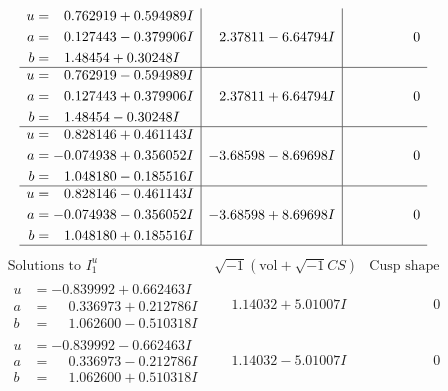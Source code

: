 \documentclass[1p]{elsarticle_modified}
\theoremstyle{definition}
\newcommand{\I}{\sqrt{-1}}
\begin{document}
$$\begin{array}{c|c|c}
\begin{aligned}
u &= \phantom{-}0.762919 + 0.594989 I \\
a &= \phantom{-}0.127443 - 0.379906 I \\
b &= \phantom{-}1.48454 + 0.30248 I\end{aligned}
 & \phantom{-}2.37811 - 6.64794 I & \phantom{-0.000000 } 0 \\ \hline\begin{aligned}
u &= \phantom{-}0.762919 - 0.594989 I \\
a &= \phantom{-}0.127443 + 0.379906 I \\
b &= \phantom{-}1.48454 - 0.30248 I\end{aligned}
 & \phantom{-}2.37811 + 6.64794 I & \phantom{-0.000000 } 0 \\ \hline\begin{aligned}
u &= \phantom{-}0.828146 + 0.461143 I \\
a &= -0.074938 + 0.356052 I \\
b &= \phantom{-}1.048180 - 0.185516 I\end{aligned}
 & -3.68598 - 8.69698 I & \phantom{-0.000000 } 0 \\ \hline\begin{aligned}
u &= \phantom{-}0.828146 - 0.461143 I \\
a &= -0.074938 - 0.356052 I \\
b &= \phantom{-}1.048180 + 0.185516 I\end{aligned}
 & -3.68598 + 8.69698 I & \phantom{-0.000000 } 0\\
 \hline 
 \end{array}$$\newpage$$\begin{array}{c|c|c}  
\text{Solutions to }I^u_{1}& \I (\text{vol} + \sqrt{-1}CS) & \text{Cusp shape}\\
 \hline 
\begin{aligned}
u &= -0.839992 + 0.662463 I \\
a &= \phantom{-}0.336973 + 0.212786 I \\
b &= \phantom{-}1.062600 - 0.510318 I\end{aligned}
 & \phantom{-}1.14032 + 5.01007 I & \phantom{-0.000000 } 0 \\ \hline\begin{aligned}
u &= -0.839992 - 0.662463 I \\
a &= \phantom{-}0.336973 - 0.212786 I \\
b &= \phantom{-}1.062600 + 0.510318 I\end{aligned}
 & \phantom{-}1.14032 - 5.01007 I & \phantom{-0.000000 } 0 \\ \hline\begin{aligned}

\end{aligned}
\end{array}$$
\end{document}
